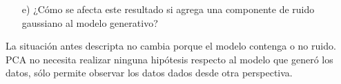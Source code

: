 \documentclass[11pt,a4paper,final]{article}
\begin{document}
\begin{enumerate}
   \item[e)] ¿Cómo se afecta este resultado si agrega una componente de ruido gaussiano al modelo generativo?
\end{enumerate}

La situación antes descripta no cambia porque el modelo contenga o no ruido. PCA no necesita realizar ninguna hipótesis respecto al modelo que generó los datos, sólo permite observar los datos dados desde otra perspectiva.
\end{document}
